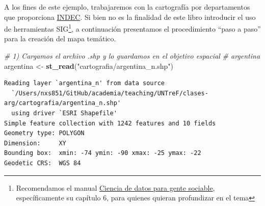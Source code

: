 \documentclass[
]{article}
\newenvironment{Shaded}{\begin{snugshade}}{\end{snugshade}}
\newcommand{\CommentTok}[1]{\textcolor[rgb]{0.56,0.35,0.01}{\textit{#1}}}
\newcommand{\FunctionTok}[1]{\textcolor[rgb]{0.13,0.29,0.53}{\textbf{#1}}}
\newcommand{\NormalTok}[1]{#1}
\newcommand{\OtherTok}[1]{\textcolor[rgb]{0.56,0.35,0.01}{#1}}
\newcommand{\StringTok}[1]{\textcolor[rgb]{0.31,0.60,0.02}{#1}}
\begin{document}
A los fines de este ejemplo, trabajaremos con la cartografía por departamentos que proporciona \href{https://www.indec.gob.ar/indec/web/Institucional-Indec-Codgeo}{INDEC}. Si bien no es la finalidad de este libro introducir el uso de herramientas SIG\footnote{Recomendamos el manual \href{https://bitsandbricks.github.io/ciencia_de_datos_gente_sociable/}{Ciencia de datos para gente sociable}, específicamente su capítulo 6, para quienes quieran profundizar en el tema}, a continuación presentamos el procedimiento ``paso a paso'' para la creación del mapa temático.

\begin{Shaded}
\begin{Highlighting}[]
\CommentTok{\# 1) Cargamos el archivo .shp y lo guardamos en el objetivo espacial}
\CommentTok{\# \textquotesingle{}argentina\textquotesingle{}}
\NormalTok{argentina }\OtherTok{\textless{}{-}} \FunctionTok{st\_read}\NormalTok{(}\StringTok{"cartografia/argentina\_n.shp"}\NormalTok{)}
\end{Highlighting}
\end{Shaded}

\begin{verbatim}
Reading layer `argentina_n' from data source 
  `/Users/nxs851/GitHub/academia/teaching/UNTreF/clases-arg/cartografia/argentina_n.shp' 
  using driver `ESRI Shapefile'
Simple feature collection with 1242 features and 10 fields
Geometry type: POLYGON
Dimension:     XY
Bounding box:  xmin: -74 ymin: -90 xmax: -25 ymax: -22
Geodetic CRS:  WGS 84
\end{verbatim}
\end{document}
